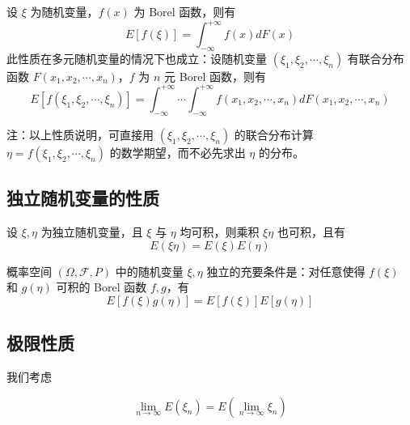\documentclass[12pt,a4paper]{amsart}
\begin{document}
\begin{proposition}
    设 $\xi$ 为随机变量，$f(x)$ 为 Borel 函数，则有
    \begin{equation}
        E[f(\xi)] = \int_{-\infty}^{+\infty} f(x) dF(x)
    \end{equation}
    此性质在多元随机变量的情况下也成立：设随机变量 $(\xi_1, \xi_2, \cdots, \xi_n)$ 有联合分布函数 $F(x_1, x_2, \cdots, x_n)$，$f$ 为 $n$ 元 Borel 函数，则有
    \begin{equation}
        E[f(\xi_1, \xi_2, \cdots, \xi_n)] = \int_{-\infty}^{+\infty} \cdots \int_{-\infty}^{+\infty} f(x_1, x_2, \cdots, x_n) dF(x_1, x_2, \cdots, x_n)
    \end{equation}
\end{proposition}

注：以上性质说明，可直接用 $(\xi_1, \xi_2, \cdots, \xi_n)$ 的联合分布计算 $\eta = f(\xi_1, \xi_2, \cdots, \xi_n)$ 的数学期望，而不必先求出 $\eta$ 的分布。

\subsection{独立随机变量的性质}

\begin{proposition}[独立随机变量数学期望的性质]
    设 $\xi, \eta$ 为独立随机变量，且 $\xi$ 与 $\eta$ 均可积，则乘积 $\xi\eta$ 也可积，且有
    \begin{equation}
        E(\xi\eta) = E(\xi)E(\eta)
    \end{equation}
\end{proposition}

\begin{proposition}[独立随机变量数学期望的等价条件]
    概率空间 $(\Omega, \mathcal{F}, P)$ 中的随机变量 $\xi, \eta$ 独立的充要条件是：对任意使得 $f(\xi)$ 和 $g(\eta)$ 可积的 Borel 函数 $f, g$，有
    \begin{equation}
        E[f(\xi)g(\eta)] = E[f(\xi)]E[g(\eta)]
    \end{equation}
\end{proposition}

\subsection{极限性质}

我们考虑

\begin{equation}\label{eq:极限性质}
    \lim\limits_{n\to\infty} E(\xi_n) = E(\lim\limits_{n\to\infty} \xi_n)
\end{equation}
\end{document}
